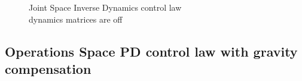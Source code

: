 \documentclass{article}
\begin{document}
\begin{figure}[H]
    \noindent

    \caption{Joint Space Inverse Dynamics control law \\ dynamics matrices are off}
    \label{fig:js_Inverse_dynamics_joits_wrong_dynamics}
\end{figure}


\subsection{Operations Space PD control law with gravity compensation}
\end{document}
